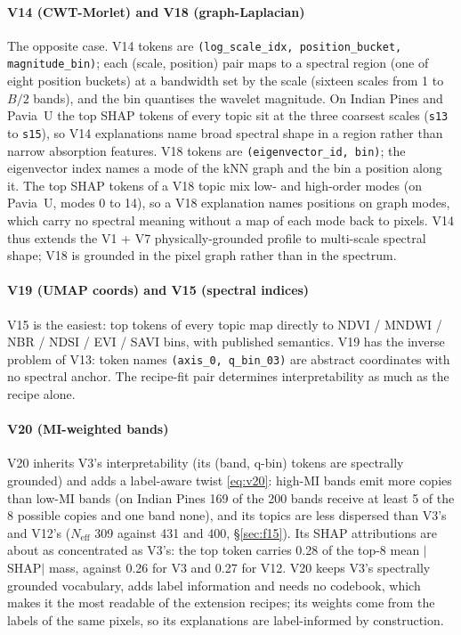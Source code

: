 \documentclass[journal,a4paper,10pt]{IEEEtran}
\begin{document}
\paragraph{V14 (CWT-Morlet) and V18 (graph-Laplacian)}
The opposite case. V14 tokens are
\texttt{(log\_scale\_idx, position\_bucket, magnitude\_bin)};
each (scale, position) pair maps to a spectral region (one of eight
position buckets) at a bandwidth set by the scale (sixteen scales
from 1 to $B/2$ bands), and the bin quantises the wavelet magnitude.
On Indian Pines and Pavia~U the top SHAP tokens of every topic sit at
the three coarsest scales (\texttt{s13} to \texttt{s15}), so V14
explanations name broad spectral shape in a region rather than narrow
absorption features. V18 tokens are \texttt{(eigenvector\_id, bin)};
the eigenvector index names a mode of the kNN graph and the bin a
position along it. The top SHAP tokens of a V18 topic mix low- and
high-order modes (on Pavia~U, modes 0 to 14), so a V18 explanation
names positions on graph modes, which carry no spectral meaning
without a map of each mode back to pixels. V14 thus extends the
V1 + V7 physically-grounded profile to multi-scale spectral shape; V18
is grounded in the pixel graph rather than in the spectrum.

\paragraph{V19 (UMAP coords) and V15 (spectral indices)}
V15 is the easiest: top tokens of every topic map directly to
NDVI / MNDWI / NBR / NDSI / EVI / SAVI bins, with published
semantics. V19 has the inverse problem of V13: token names
\texttt{(axis\_0, q\_bin\_03)} are abstract coordinates with no
spectral anchor. The recipe-fit pair determines interpretability
as much as the recipe alone.

\paragraph{V20 (MI-weighted bands)}
V20 inherits V3's interpretability (its (band, q-bin) tokens are
spectrally grounded) and adds a label-aware twist \eqref{eq:v20}:
high-MI bands emit more copies than low-MI bands (on Indian Pines 169
of the 200 bands receive at least 5 of the 8 possible copies and one
band none), and its topics are less dispersed than V3's and V12's
($N_{\mathrm{eff}}$ 309 against 431 and 400, \S\ref{sec:f15}). Its SHAP
attributions are about as concentrated as V3's: the top token carries
0.28 of the top-8 mean $|$SHAP$|$ mass, against 0.26 for V3 and 0.27
for V12. V20 keeps V3's spectrally grounded vocabulary, adds label
information and needs no codebook, which makes it the most readable of
the extension recipes; its weights come from the labels of the same
pixels, so its explanations are label-informed by construction.
\end{document}
